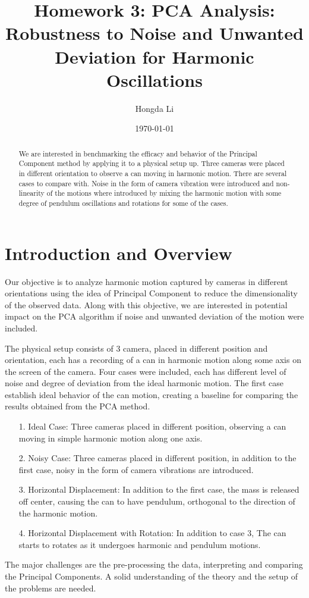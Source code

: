 \documentclass{article}
\title{Homework 3: PCA Analysis: Robustness to Noise and Unwanted Deviation for Harmonic Oscillations}
\author{Hongda Li}
\date{\today}
\begin{document}
\maketitle

\begin{abstract}
   We are interested in benchmarking the efficacy and behavior of the Principal Component method by applying it to a physical setup up. Three cameras were placed in different orientation to observe a can moving in harmonic motion. There are several cases to compare with. Noise in the form of camera vibration were introduced and non-linearity of the motions where introduced by mixing the harmonic motion with some degree of pendulum oscillations and rotations for some of the cases.
\end{abstract}


\section{Introduction and Overview}
    \hspace{1.1em}
    Our objective is to analyze harmonic motion captured by cameras in different orientations using the idea of Principal Component to reduce the dimensionality of the observed data. Along with this objective, we are interested in potential impact on the PCA algorithm if noise and unwanted deviation of the motion were included. 
    \par
    The physical setup consists of 3 camera, placed in different position and orientation, each has a recording of a can in harmonic motion along some axis on the screen of the camera. Four cases were included, each has different level of noise and degree of deviation from the ideal harmonic motion. The first case establish ideal behavior of the can motion, creating a baseline for comparing the results obtained from the PCA method. 
    \begin{enumerate}
        \item[1.] Ideal Case: Three cameras placed in different position, observing a can moving in simple harmonic motion along one axis. 
        \item[2.] Noisy Case: Three cameras placed in different position, in addition to the first case, noisy in the form of camera vibrations are introduced. 
        \item[3.] Horizontal Displacement: In addition to the first case, the mass is released off center, causing the can to have pendulum, orthogonal to the direction of the harmonic motion. 
        \item[4.] Horizontal Displacement with Rotation: In addition to case 3, The can starts to rotates as it undergoes harmonic and pendulum motions. 
    \end{enumerate}
    \par
    The major challenges are the pre-processing the data, interpreting and comparing the Principal Components. A solid understanding of the theory and the setup of the problems are needed. 
\end{document}

